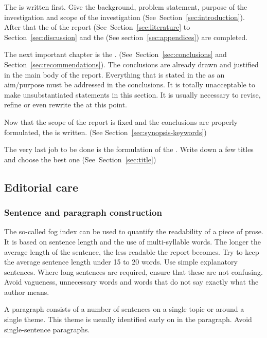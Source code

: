 \documentclass[a4paper,12pt]{article}
\begin{document}
The  is written first.  Give the
background, problem statement, purpose of the investigation and scope
of the investigation (See~Section~\ref{sec:introduction}).  After that
the
 of the report
(See~Section~\ref{sec:literature} to Section~\ref{sec:discussion} and
the  (See section~\ref{sec:appendices}) are
completed.

The next important chapter is the .  (See~Section~\ref{sec:conclusions} and
Section~\ref{sec:recommendations}).  The conclusions are already drawn
and justified in the main body of the report.  Everything that is
stated in the  as an aim/purpose must be
addressed in the conclusions.  It is totally unacceptable to make
unsubstantiated statements in this section.  It is usually necessary
to revise, refine or even rewrite the  at
this point.

Now that the scope of the report is fixed and the conclusions are
properly formulated, the  is written.  (See
Section~\ref{sec:synopsis-keywords})

The very last job to be done is the formulation of
the .  Write down a few titles and choose the
best one (See~Section~\ref{sec:title})

\subsection{Editorial care}

\subsubsection{Sentence and paragraph construction}
The so-called fog index can be used to quantify the readability of a
piece of prose.  It is based on sentence length and the use of
multi-syllable words.  The longer the average length of the sentence,
the less readable the report becomes.  Try to keep the average
sentence length under 15 to 20 words.  Use simple explanatory
sentences.  Where long sentences are required, ensure that these are
not confusing.  Avoid vagueness, unnecessary words and words that do
not say exactly what the author means.

A paragraph consists of a number of sentences on a single topic or
around a single theme.  This theme is usually identified early on in
the paragraph.  Avoid single-sentence paragraphs.
\end{document}

